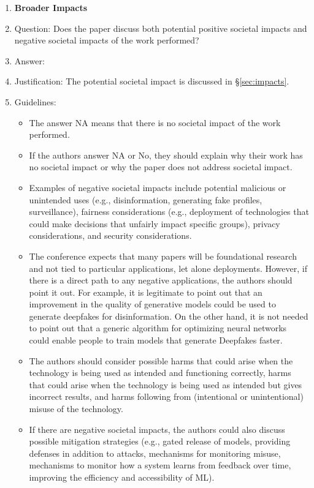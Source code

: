 \documentclass[11pt]{article}
\theoremstyle{plain}
\theoremstyle{definition}
\theoremstyle{remark}
\renewcommand{\^}[1]{^{(#1)}}
\begin{document}
\begin{enumerate}
\item {\bf Broader Impacts}
    \item[] Question: Does the paper discuss both potential positive societal impacts and negative societal impacts of the work performed?
    \item[] Answer: \answerYes{} 
    \item[] Justification: The potential societal impact is discussed in \S\ref{sec:impacts}.
    \item[] Guidelines:
    \begin{itemize}
        \item The answer NA means that there is no societal impact of the work performed.
        \item If the authors answer NA or No, they should explain why their work has no societal impact or why the paper does not address societal impact.
        \item Examples of negative societal impacts include potential malicious or unintended uses (e.g., disinformation, generating fake profiles, surveillance), fairness considerations (e.g., deployment of technologies that could make decisions that unfairly impact specific groups), privacy considerations, and security considerations.
        \item The conference expects that many papers will be foundational research and not tied to particular applications, let alone deployments. However, if there is a direct path to any negative applications, the authors should point it out. For example, it is legitimate to point out that an improvement in the quality of generative models could be used to generate deepfakes for disinformation. On the other hand, it is not needed to point out that a generic algorithm for optimizing neural networks could enable people to train models that generate Deepfakes faster.
        \item The authors should consider possible harms that could arise when the technology is being used as intended and functioning correctly, harms that could arise when the technology is being used as intended but gives incorrect results, and harms following from (intentional or unintentional) misuse of the technology.
        \item If there are negative societal impacts, the authors could also discuss possible mitigation strategies (e.g., gated release of models, providing defenses in addition to attacks, mechanisms for monitoring misuse, mechanisms to monitor how a system learns from feedback over time, improving the efficiency and accessibility of ML).
    \end{itemize}


\end{enumerate}
\end{document}
